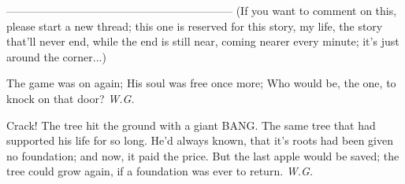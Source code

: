 --------------------------------------------------------------
(If you want to comment on this, please start a new thread; this one is reserved for this story, my life, the story that'll never end, while the end is still near, coming nearer every minute; it's just around the corner...)

The game 
was on again; 
His soul was free 
once more; 
Who would be, 
the one, 
to knock 
on that door?
\emph{W.G.}

Crack! 
The tree hit the ground 
with a giant BANG. 
The same tree 
that had supported 
his life 
for so long. 
He'd always known, 
that it's roots 
had been given no foundation; 
and now, it paid the price. 
But the last apple would be saved; 
the tree could grow again, 
if a foundation 
was ever to return. 
\emph{W.G.}
